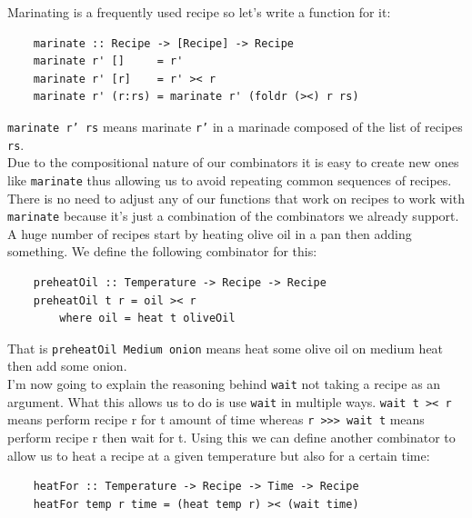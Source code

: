 \documentclass[11pt]{article}
\begin{document}
    Marinating is a frequently used recipe so let's write a function for it:
    \begin{tt}
    \small
    \begin{lstlisting}
    marinate :: Recipe -> [Recipe] -> Recipe
    marinate r' []     = r'
    marinate r' [r]    = r' >< r
    marinate r' (r:rs) = marinate r' (foldr (><) r rs)
    \end{lstlisting}
    \end{tt}
    \texttt{marinate r' rs} means marinate \texttt{r'} in a marinade composed
    of the list of recipes \texttt{rs}. \\

    Due to the compositional nature of our combinators it is easy to create new
    ones like \texttt{marinate} thus allowing us to avoid repeating common
    sequences of recipes. There is no need to adjust any of our functions that
    work on recipes to work with \texttt{marinate} because it's just a combination
    of the combinators we already support. \\

    A huge number of recipes start by heating olive oil in a pan then adding something.
    We define the following combinator for this:
    \begin{tt}
    \small
    \begin{lstlisting}
    preheatOil :: Temperature -> Recipe -> Recipe
    preheatOil t r = oil >< r
        where oil = heat t oliveOil
    \end{lstlisting}
    \end{tt}
    That is \texttt{preheatOil Medium onion} means heat some olive oil on medium heat
    then add some onion. \\

    I'm now going to explain the reasoning behind \texttt{wait} not taking a recipe as
    an argument. What this allows us to do is use \texttt{wait} in multiple ways.
    \texttt{wait t >< r} means perform recipe r for t amount of time whereas
    \texttt{r >>> wait t} means perform recipe r then wait for t. Using this we
    can define another combinator to allow us to heat a recipe at a given temperature
    but also for a certain time:
    \begin{tt}
    \small
    \begin{lstlisting}
    heatFor :: Temperature -> Recipe -> Time -> Recipe
    heatFor temp r time = (heat temp r) >< (wait time)
    \end{lstlisting}
    \end{tt}
\end{document}
